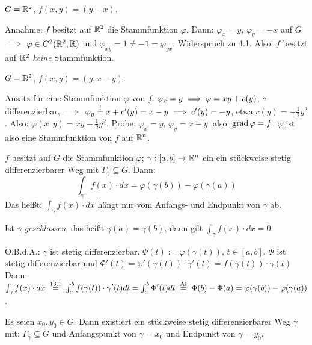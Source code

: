 \documentclass[a4paper,twoside,DIV15,BCOR12mm]{scrbook}
\begin{document}
\begin{beispiele}
\item $G=\mathbb{R}^2$, $f(x,y) = (y,-x)$.

Annahme: $f$ besitzt auf $\mathbb{R}^2$ die Stammfunktion $\varphi$. Dann: $\varphi_x = y$, $\varphi_y = -x$ auf $G$ $\implies$ $\varphi\in C^2(\mathbb{R}^2,\mathbb{R})$ und $\varphi_{xy} = 1 \ne -1 = \varphi_{yx}$. Widerspruch zu 4.1. Also: $f$ besitzt auf $\mathbb{R}^2$ \emph{keine} Stammfunktion.
\item $G=\mathbb{R}^2$, $f(x,y) = (y,x-y)$.

Ansatz für eine Stammfunktion $\varphi$ von $f$: $\varphi_x=y \implies \varphi=xy+c(y)$, $c$ differenzierbar, $\implies$ $\varphi_y\stackrel{!}{=}x+c'(y) = x-y \implies c'(y) = -y$, etwa $c(y)=-\frac{1}{2}y^2$. Also: $\varphi(x,y) = xy - \frac{1}{2}y^2$. Probe: $\varphi_x=y$, $\varphi_y=x-y$, also: $\mathop{\rm grad}\nolimits\varphi=f$. $\varphi$ ist also eine Stammfunktion von $f$ auf $\mathbb{R}^n$.
\end{beispiele}
\vspace{2em} %
\begin{satz}
$f$ besitzt auf $G$ die Stammfunktion $\varphi$; $\gamma:[a,b]\to\mathbb{R}^n$ ein ein stückweise stetig differenzierbarer Weg mit $\Gamma_\gamma\subseteq G$. Dann:
$$ \int_\gamma f(x)\cdot dx = \varphi\left(\gamma(b)\right) - \varphi\left(\gamma(a)\right) $$
Das heißt: $\int_\gamma f(x)\cdot dx$ hängt nur vom Anfangs- und Endpunkt von $\gamma$ ab.

Ist $\gamma$ \emph{geschlossen}, das heißt $\gamma(a) = \gamma(b)$, dann gilt $\int_\gamma f(x)\cdot dx = 0$.
\end{satz}

\begin{beweis}
O.B.d.A.: $\gamma$ ist stetig differenzierbar. $\Phi(t):= \varphi (\gamma(t))$, $t\in[a,b]$. $\Phi$ ist stetig differenzierbar und $\Phi'(t) = \varphi'(\gamma(t))\cdot \gamma'(t) = f(\gamma(t))\cdot\gamma(t)$ Dann: $\int_\gamma f(x)\cdot dx \gleichnach{13.1} \int_a^bf(\gamma(t))\cdot\gamma'(t)dt = \int_a^b\Phi'(t)dt \gleichnach{AI} \Phi(b)-\Phi(a) = \varphi(\gamma(b))-\varphi(\gamma(a))$.
\end{beweis}

\begin{wichtigerhilfssatz}
Es seien $x_0,y_0\in G$. Dann existiert ein stückweise stetig differenzierbarer Weg $\gamma$ mit: $\Gamma_\gamma\subseteq G$ und Anfangspunkt von $\gamma = x_0$ und Endpunkt von $\gamma=y_0$.
\end{wichtigerhilfssatz}
\end{document}

